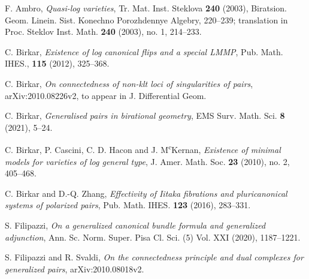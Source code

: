 \documentclass[11pt]{amsart}
\numberwithin{equation}{section}
\theoremstyle{definition}
\theoremstyle{definition}
\theoremstyle{definition}
\begin{document}
\begin{thebibliography}{ABCDE}

 F. Ambro, \textit{Quasi-log varieties}, Tr. Mat. Inst. Steklova \textbf{240} (2003), Biratsion. Geom. Linein. Sist. Konechno Porozhdennye Algebry, 220--239; translation in Proc. Steklov Inst. Math. \textbf{240} (2003), no. 1, 214--233.

 C. Birkar, \textit{Existence of log canonical flips and a special LMMP}, Pub. Math. IHES., \textbf{115} (2012), 325--368.


 C. Birkar, \textit{On connectedness of non-klt loci of singularities of pairs}, arXiv:2010.08226v2, to appear in J. Differential Geom.


  C. Birkar, \textit{Generalised pairs in birational geometry}, EMS Surv. Math. Sci. \textbf{8} (2021), 5--24.
	
C. Birkar, P. Cascini, C. D. Hacon and J. M\textsuperscript{c}Kernan, \textit{Existence of minimal models for varieties of log general type}, J. Amer. Math. Soc. \textbf{23} (2010), no. 2, 405--468.


 C. Birkar and D.-Q. Zhang, \textit{Effectivity of Iitaka fibrations and pluricanonical systems of polarized pairs}, Pub. Math. IHES. \textbf{123} (2016), 283--331.


 S. Filipazzi, \textit{On a generalized canonical bundle formula and generalized adjunction}, Ann. Sc. Norm. Super. Pisa Cl. Sci. (5) Vol. XXI (2020), 1187--1221.

 S. Filipazzi and R. Svaldi, \textit{On the connectedness principle and dual complexes for generalized pairs}, arXiv:2010.08018v2.




\end{thebibliography}
\end{document}
